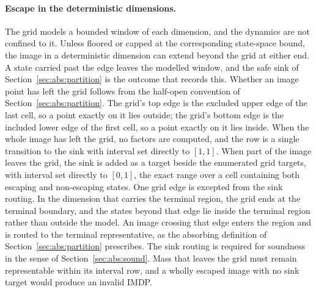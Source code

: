 \documentclass[11pt,a4paper]{article}
\theoremstyle{plain}
\theoremstyle{remark}
\begin{document}
	\paragraph{Escape in the deterministic dimensions.}
	The grid models a bounded window of each dimension, and the dynamics
	are not confined to it. Unless floored or capped at the corresponding
	state-space bound, the image in a deterministic dimension can extend
	beyond the grid at either end. A state carried past the edge leaves
	the modelled window, and the safe sink of
	Section~\ref{sec:abs:partition} is the outcome that records this.
	Whether an image point has left the grid follows from the half-open
	convention of Section~\ref{sec:abs:partition}. The grid's top edge is
	the excluded upper edge of the last cell, so a point exactly on it
	lies outside; the grid's bottom edge is the included lower edge of
	the first cell, so a point exactly on it lies inside. When the whole
	image has left the grid, no factors are computed, and the row is a
	single transition to the sink with interval set directly to $[1,1]$.
	When part of the image leaves the grid, the sink is added as a target
	beside the enumerated grid targets, with interval set directly to
	$[0,1]$, the exact range over a cell containing both escaping and
	non-escaping states. One grid edge is excepted from the sink routing.
	In the dimension that carries the terminal region, the grid ends at
	the terminal boundary, and the states beyond that edge lie inside the
	terminal region rather than outside the model. An image crossing that
	edge enters the region and is routed to the terminal representative,
	as the absorbing definition of Section~\ref{sec:abs:partition}
	prescribes. The sink routing is required for soundness in the sense
	of Section~\ref{sec:abs:sound}. Mass that leaves the grid must remain
	representable within its interval row, and a wholly escaped image
	with no sink target would produce an invalid IMDP.
	
\end{document}
